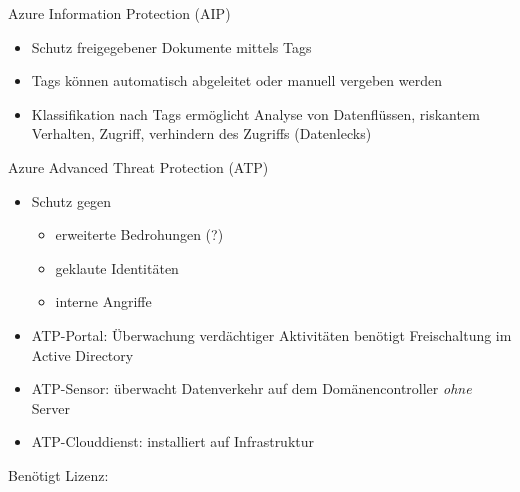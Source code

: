 \begin{flashcard}[Definition]{Azure Information Protection (AIP)}
    \begin{itemize}
        \item Schutz freigegebener Dokumente mittels Tags
        \item Tags können automatisch abgeleitet oder manuell vergeben werden
        \item Klassifikation nach Tags ermöglicht Analyse von Datenflüssen, riskantem Verhalten, Zugriff, verhindern des Zugriffs (Datenlecks)
    \end{itemize}
\end{flashcard}

\begin{flashcard}[Describe]{Azure Advanced Threat Protection (ATP)}
    \begin{itemize}
        \item Schutz gegen 
        \begin{itemize}
            \item erweiterte Bedrohungen (?)
            \item geklaute Identitäten
            \item interne Angriffe
        \end{itemize}
        \item ATP-Portal: Überwachung verdächtiger Aktivitäten\newline
            benötigt Freischaltung im Active Directory
        \item ATP-Sensor: überwacht Datenverkehr auf dem Domänencontroller \emph{ohne} Server
        \item ATP-Clouddienst: installiert auf Infrastruktur
    \end{itemize}
    Benötigt Lizenz:
\end{flashcard}
